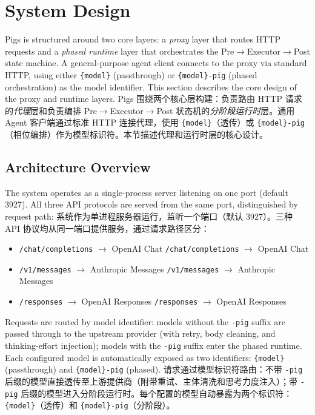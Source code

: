 \section{System Design}
\label{sec:design}

Pigs is structured around two core layers: a \emph{proxy} layer that routes HTTP requests and a \emph{phased runtime} layer that orchestrates the Pre$\rightarrow$Executor$\rightarrow$Post state machine. A general-purpose agent client connects to the proxy via standard HTTP, using either \texttt{\{model\}} (passthrough) or \texttt{\{model\}-pig} (phased orchestration) as the model identifier. This section describes the core design of the proxy and runtime layers.
Pigs 围绕两个核心层构建：负责路由 HTTP 请求的\emph{代理}层和负责编排 Pre$\rightarrow$Executor$\rightarrow$Post 状态机的\emph{分阶段运行时}层。通用 Agent 客户端通过标准 HTTP 连接代理，使用 \texttt{\{model\}}（透传）或 \texttt{\{model\}-pig}（相位编排）作为模型标识符。本节描述代理和运行时层的核心设计。

\subsection{Architecture Overview}
\label{sec:overview}

The system operates as a single-process server listening on one port (default 3927). All three API protocols are served from the same port, distinguished by request path:
系统作为单进程服务器运行，监听一个端口（默认 3927）。三种 API 协议均从同一端口提供服务，通过请求路径区分：

\begin{itemize}[nosep]
    \item \texttt{/chat/completions} $\rightarrow$ OpenAI Chat
    \texttt{/chat/completions} $\rightarrow$ OpenAI Chat
    \item \texttt{/v1/messages} $\rightarrow$ Anthropic Messages
    \texttt{/v1/messages} $\rightarrow$ Anthropic Messages
    \item \texttt{/responses} $\rightarrow$ OpenAI Responses
    \texttt{/responses} $\rightarrow$ OpenAI Responses
\end{itemize}

Requests are routed by model identifier: models without the \texttt{-pig} suffix are passed through to the upstream provider (with retry, body cleaning, and thinking-effort injection); models with the \texttt{-pig} suffix enter the phased runtime. Each configured model is automatically exposed as two identifiers: \texttt{\{model\}} (passthrough) and \texttt{\{model\}-pig} (phased).
请求通过模型标识符路由：不带 \texttt{-pig} 后缀的模型直接透传至上游提供商（附带重试、主体清洗和思考力度注入）；带 \texttt{-pig} 后缀的模型进入分阶段运行时。每个配置的模型自动暴露为两个标识符：\texttt{\{model\}}（透传）和 \texttt{\{model\}-pig}（分阶段）。

